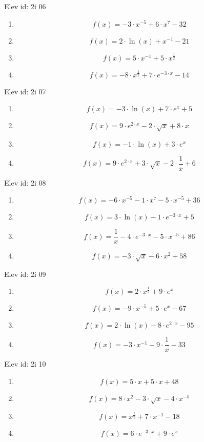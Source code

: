 \item Elev id: 2i 06
\begin{enumerate}
\item 
$$
f(x)=-3\cdot x^{-5}+6\cdot x^7-32
$$
\item 
$$
f(x)=2\cdot \ln(x)+x^{-1}-21
$$
\item 
$$
f(x)=5\cdot x^{-1}+5\cdot x^{\frac{1}{2}}
$$
\item 
$$
f(x)=-8\cdot x^{\frac{1}{2}}+7\cdot e^{-3\cdot x}-14
$$
\end{enumerate}
\item Elev id: 2i 07
\begin{enumerate}
\item 
$$
f(x)=-3\cdot \ln(x)+7\cdot e^x+5
$$
\item 
$$
f(x)=9\cdot e^{2\cdot x}-2\cdot \sqrt{x}+8\cdot x
$$
\item 
$$
f(x)=-1\cdot \ln(x)+3\cdot e^x
$$
\item 
$$
f(x)=9\cdot e^{2\cdot x}+3\cdot \sqrt{x}-2\cdot \frac{1}{x}+6
$$
\end{enumerate}
\item Elev id: 2i 08
\begin{enumerate}
\item 
$$
f(x)=-6\cdot x^{-5}-1\cdot x^7-5\cdot x^{-5}+36
$$
\item 
$$
f(x)=3\cdot \ln(x)-1\cdot e^{-3\cdot x}+5
$$
\item 
$$
f(x)=\frac{1}{x}-4\cdot e^{-3\cdot x}-5\cdot x^{-5}+86
$$
\item 
$$
f(x)=-3\cdot \sqrt{x}-6\cdot x^2+58
$$
\end{enumerate}
\item Elev id: 2i 09
\begin{enumerate}
\item 
$$
f(x)=2\cdot x^{\frac{1}{2}}+9\cdot e^x
$$
\item 
$$
f(x)=-9\cdot x^{-5}+5\cdot e^x-67
$$
\item 
$$
f(x)=2\cdot \ln(x)-8\cdot e^{2\cdot x}-95
$$
\item 
$$
f(x)=-3\cdot x^{-1}-9\cdot \frac{1}{x}-33
$$
\end{enumerate}
\item Elev id: 2i 10
\begin{enumerate}
\item 
$$
f(x)=5\cdot x+5\cdot x+48
$$
\item 
$$
f(x)=8\cdot x^2-3\cdot \sqrt{x}-4\cdot x^{-5}
$$
\item 
$$
f(x)=x^{\frac{1}{2}}+7\cdot x^{-1}-18
$$
\item 
$$
f(x)=6\cdot e^{-3\cdot x}+9\cdot e^x
$$
\end{enumerate}
